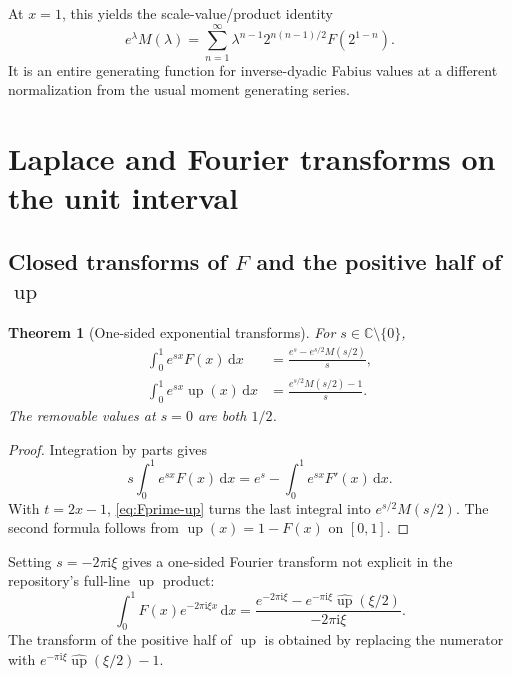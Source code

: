 \documentclass[11pt]{article}
\newtheorem{theorem}{Theorem}[section]
\theoremstyle{definition}
\theoremstyle{remark}
\DeclareMathOperator{\upf}{up}
\newcommand{\C}{\mathbb C}
\newcommand{\dd}{\,\mathrm d}
\newcommand{\ii}{\mathrm i}
\begin{document}
At \(x=1\), this yields the scale-value/product identity
\begin{equation}
 e^\lambda M(\lambda)
 =\sum_{n=1}^{\infty}\lambda^{n-1}
   2^{n(n-1)/2}F(2^{1-n}).                                \label{eq:resolvent-product-identity}
\end{equation}
It is an entire generating function for inverse-dyadic Fabius values at a different
normalization from the usual moment generating series.

\section{Laplace and Fourier transforms on the unit interval}

\subsection{Closed transforms of \(F\) and the positive half of \(\upf\)}

\begin{theorem}[One-sided exponential transforms]
\label{thm:one-sided-laplace}
For \(s\in\C\setminus\{0\}\),
\begin{align}
 \int_0^1e^{sx}F(x)\dd x
 &=\frac{e^s-e^{s/2}M(s/2)}{s},                           \label{eq:F-laplace}\\
 \int_0^1e^{sx}\upf(x)\dd x
 &=\frac{e^{s/2}M(s/2)-1}{s}.                             \label{eq:up-half-laplace}
\end{align}
The removable values at \(s=0\) are both \(1/2\).
\end{theorem}

\begin{proof}
Integration by parts gives
\[
 s\int_0^1e^{sx}F(x)\dd x=e^s-\int_0^1e^{sx}F'(x)\dd x.
\]
With \(t=2x-1\), \eqref{eq:Fprime-up} turns the last integral into
\(e^{s/2}M(s/2)\).  The second formula follows from \(\upf(x)=1-F(x)\) on
\([0,1]\).
\end{proof}

Setting \(s=-2\pi\ii\xi\) gives a one-sided Fourier transform not explicit in the
repository's full-line \(\upf\) product:
\begin{equation}
 \int_0^1F(x)e^{-2\pi\ii\xi x}\dd x
 =\frac{e^{-2\pi\ii\xi}-e^{-\pi\ii\xi}\widehat{\upf}(\xi/2)}
 {-2\pi\ii\xi}.                                          \label{eq:F-fourier-one-sided}
\end{equation}
The transform of the positive half of \(\upf\) is obtained by replacing the numerator
with \(e^{-\pi\ii\xi}\widehat{\upf}(\xi/2)-1\).
\end{document}
